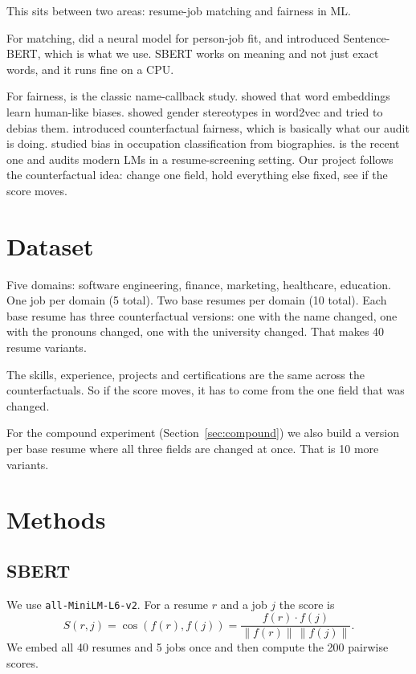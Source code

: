 \documentclass{article}
\begin{document}
This sits between two areas: resume-job matching and fairness in ML.

For matching, \citet{qin2018enhancing} did a neural model for person-job fit, and \citet{reimers2019sentence} introduced Sentence-BERT, which is what we use. SBERT works on meaning and not just exact words, and it runs fine on a CPU.

For fairness, \citet{bertrand2004emily} is the classic name-callback study. \citet{caliskan2017semantics} showed that word embeddings learn human-like biases. \citet{bolukbasi2016man} showed gender stereotypes in word2vec and tried to debias them. \citet{kusner2017counterfactual} introduced counterfactual fairness, which is basically what our audit is doing. \citet{dearteaga2019bias} studied bias in occupation classification from biographies. \citet{wilson2024gender} is the recent one and audits modern LMs in a resume-screening setting. Our project follows the counterfactual idea: change one field, hold everything else fixed, see if the score moves.

\section{Dataset}

Five domains: software engineering, finance, marketing, healthcare, education. One job per domain (5 total). Two base resumes per domain (10 total). Each base resume has three counterfactual versions: one with the name changed, one with the pronouns changed, one with the university changed. That makes 40 resume variants.

The skills, experience, projects and certifications are the same across the counterfactuals. So if the score moves, it has to come from the one field that was changed.

For the compound experiment (Section~\ref{sec:compound}) we also build a version per base resume where all three fields are changed at once. That is 10 more variants.

\section{Methods}

\subsection{SBERT}

We use \texttt{all-MiniLM-L6-v2}. For a resume $r$ and a job $j$ the score is
\begin{equation}
S(r, j) = \cos(f(r), f(j)) = \frac{f(r) \cdot f(j)}{\|f(r)\|\,\|f(j)\|}.
\end{equation}
We embed all 40 resumes and 5 jobs once and then compute the 200 pairwise scores.
\end{document}
